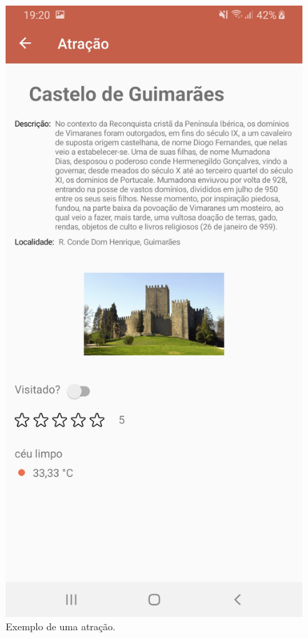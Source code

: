 \begin{figure}[H]
\centering
\includegraphics[width=0.5\linewidth]{images/atracao.jpg}
\caption{Exemplo de uma atração.}
\end{figure}